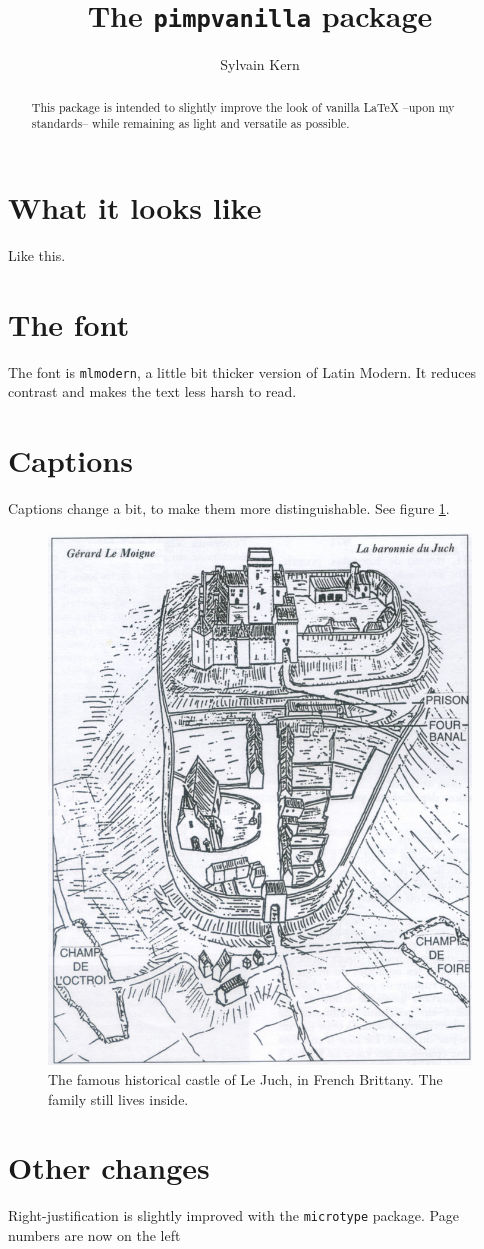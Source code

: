 \documentclass[12pt]{article}
\title{The \texttt{pimpvanilla} package}
\author{Sylvain Kern}
\begin{document}
\maketitle

\begin{abstract}
    This package is intended to slightly improve the look of vanilla \LaTeX{} --upon my standards-- while remaining as light and versatile as possible.
\end{abstract}

\section{What it looks like}

Like this. \lipsum[1-2]

\section{The font}

The font is \texttt{mlmodern}, a little bit thicker version of Latin Modern. It reduces contrast and makes the text less harsh to read.

\section{Captions}

Captions change a bit, to make them more distinguishable. See figure \ref{fig:juch}.

\begin{figure}
    \centering
    \includegraphics[width=.75\textwidth]{lejuch.png}
    \caption{The famous historical castle of Le Juch, in French Brittany. The family still lives inside. \lipsum[3]\label{fig:juch}}
\end{figure}


\section{Other changes}

Right-justification is slightly improved with the \texttt{microtype} package. Page numbers are now on the left
\end{document}
